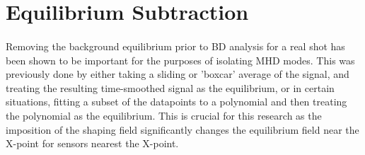\section{Equilibrium Subtraction}
\paragraph{}
Removing the background equilibrium prior to BD analysis for a real shot has been shown to be important for the purposes of isolating MHD modes.  This was previously done by either taking a sliding or 'boxcar' average of the signal, and treating the resulting time-smoothed signal as the equilibrium, or in certain situations, fitting a subset of the datapoints to a polynomial and then treating the polynomial as the equilibrium.  This is crucial for this research as the imposition of the shaping field significantly changes the equilibrium field near the X-point for sensors nearest the X-point. 